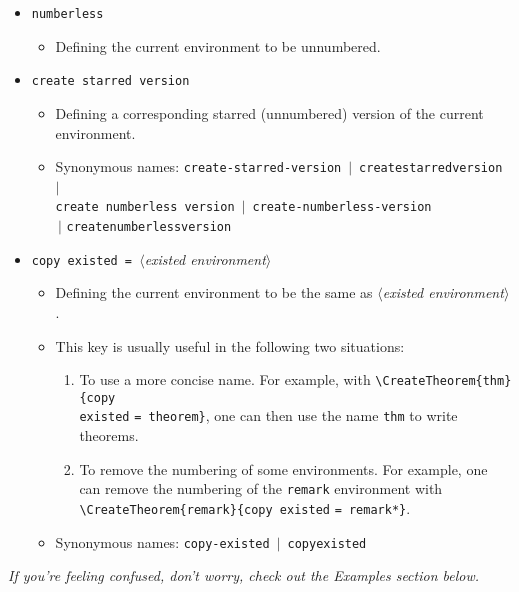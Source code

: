 \documentclass[classical]{einfart}
\providecommand{\meta}[1]{$\langle${\normalfont\itshape#1}$\rangle$}
\newcommand{\commandoption}[1]{\texttt{\textcolor{black!67!cyan}{#1}}}
\begin{document}
\begin{itemize}
    \item \commandoption{numberless}
        \begin{itemize}
            \item Defining the current environment to be unnumbered.
        \end{itemize}
    \item \commandoption{create starred version}
        \begin{itemize}
            \item Defining a corresponding starred (unnumbered) version of the current environment.
            \item Synonymous names: \commandoption{create-starred-version} \,$|$\, \commandoption{createstarredversion} \,$|$\, \\\phantom{Synonymous names: }\commandoption{create numberless version} \,$|$\, \commandoption{create-numberless-version} \\\phantom{Synonymous names: }\,$|$ \commandoption{createnumberlessversion}
        \end{itemize}
    \item \commandoption{copy existed}\lstinline| = |\meta{existed environment}
        \begin{itemize}
            \item Defining the current environment to be the same as \meta{existed environment}.
            \item This key is usually useful in the following two situations:
                \begin{enumerate}
                    \item To use a more concise name. For example, with \lstinline|\CreateTheorem{thm}{|\commandoption{copy \\existed} \lstinline|= theorem}|, one can then use the name \texttt{thm} to write theorems.
                    \item To remove the numbering of some environments. For example, one can remove the numbering of the \texttt{remark} environment with \lstinline|\CreateTheorem{remark}{|\commandoption{copy existed} \lstinline|= remark*}|.
                \end{enumerate}
            \item Synonymous names: \commandoption{copy-existed} \,$|$\, \commandoption{copyexisted}
        \end{itemize}
\end{itemize}

\begin{center}
    \itshape
    If you're feeling confused, don't worry, check out the Examples section below.
\end{center}
\end{document}

